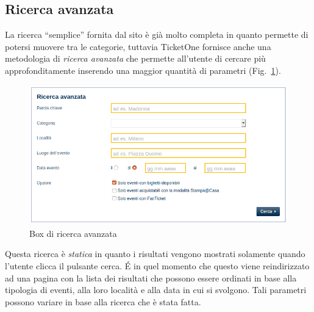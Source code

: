 \subsection{Ricerca avanzata}

	La ricerca ``semplice'' fornita dal sito è già molto completa in quanto permette di potersi muovere tra le categorie, tuttavia TicketOne fornisce anche una metodologia di \textit{ricerca avanzata} che permette all'utente di cercare più approfonditamente inserendo una maggior quantità di parametri (Fig.~\ref{ricerca3}).
	\begin{figure}[hbt]
		\centering
		\includegraphics[width=\textwidth-.95cm]{img/ricerca_3.png}
		\caption{Box di ricerca avanzata}
		\label{ricerca3}
	\end{figure}

	Questa ricerca è \textit{statica} in quanto i risultati vengono mostrati solamente quando l'utente clicca il pulsante cerca.
	\'E in quel momento che questo viene reindirizzato ad una pagina con la lista dei risultati che possono essere ordinati in base alla tipologia di eventi, alla loro località e alla data in cui si svolgono.
	Tali parametri possono variare in base alla ricerca che è stata fatta.
	
